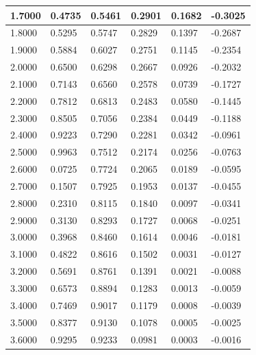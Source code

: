\documentclass{article}
\begin{document}
\begin{table}[H]
\begin{tabular}{|l|l|l|l|l|l|}
    1.7000    &  0.4735   &     0.5461   &     0.2901   &     0.1682   &    -0.3025\\\hline
    1.8000    &  0.5295   &     0.5747   &     0.2829   &     0.1397   &    -0.2687\\\hline
    1.9000    &  0.5884   &     0.6027   &     0.2751   &     0.1145   &    -0.2354\\\hline
    2.0000    &  0.6500   &     0.6298   &     0.2667   &     0.0926   &    -0.2032\\\hline
    2.1000    &  0.7143   &     0.6560   &     0.2578   &     0.0739   &    -0.1727\\\hline
    2.2000    &  0.7812   &     0.6813   &     0.2483   &     0.0580   &    -0.1445\\\hline
    2.3000    &  0.8505   &     0.7056   &     0.2384   &     0.0449   &    -0.1188\\\hline
    2.4000    &  0.9223   &     0.7290   &     0.2281   &     0.0342   &    -0.0961\\\hline
    2.5000    &  0.9963   &     0.7512   &     0.2174   &     0.0256   &    -0.0763\\\hline
    2.6000    &  0.0725   &     0.7724   &     0.2065   &     0.0189   &    -0.0595\\\hline
    2.7000    &  0.1507   &     0.7925   &     0.1953   &     0.0137   &    -0.0455\\\hline
    2.8000    &  0.2310   &     0.8115   &     0.1840   &     0.0097   &    -0.0341\\\hline
    2.9000    &  0.3130   &     0.8293   &     0.1727   &     0.0068   &    -0.0251\\\hline
    3.0000    &  0.3968   &     0.8460   &     0.1614   &     0.0046   &    -0.0181\\\hline
    3.1000    &  0.4822   &     0.8616   &     0.1502   &     0.0031   &    -0.0127\\\hline
    3.2000    &  0.5691   &     0.8761   &     0.1391   &     0.0021   &    -0.0088\\\hline
    3.3000    &  0.6573   &     0.8894   &     0.1283   &     0.0013   &    -0.0059\\\hline
    3.4000    &  0.7469   &     0.9017   &     0.1179   &     0.0008   &    -0.0039\\\hline
    3.5000    &  0.8377   &     0.9130   &     0.1078   &     0.0005   &    -0.0025\\\hline
    3.6000    &  0.9295   &     0.9233   &     0.0981   &     0.0003   &    -0.0016\\\hline

\end{tabular}
\end{table}
\end{document}
